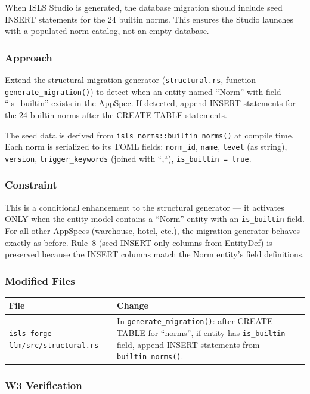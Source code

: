\documentclass[11pt,a4paper]{article}
\begin{document}
When ISLS Studio is generated, the database migration should include
seed INSERT statements for the 24 builtin norms. This ensures the
Studio launches with a populated norm catalog, not an empty database.

\subsubsection{Approach}

Extend the structural migration generator (\texttt{structural.rs},
function \texttt{generate\_migration()}) to detect when an entity
named ``Norm'' with field ``is\_builtin'' exists in the AppSpec. If
detected, append INSERT statements for the 24 builtin norms after
the CREATE TABLE statements.

The seed data is derived from \texttt{isls\_norms::builtin\_norms()}
at compile time. Each norm is serialized to its TOML fields:
\texttt{norm\_id}, \texttt{name}, \texttt{level} (as string),
\texttt{version}, \texttt{trigger\_keywords} (joined with ``,``),
\texttt{is\_builtin = true}.

\subsubsection{Constraint}

This is a conditional enhancement to the structural generator --- it
activates ONLY when the entity model contains a ``Norm'' entity with
an \texttt{is\_builtin} field. For all other AppSpecs (warehouse,
hotel, etc.), the migration generator behaves exactly as before.
Rule~8 (seed INSERT only columns from EntityDef) is preserved because
the INSERT columns match the Norm entity's field definitions.

\subsubsection{Modified Files}

\begin{longtable}{lp{10cm}}
\toprule
\textbf{File} & \textbf{Change} \\
\midrule
\texttt{isls-forge-llm/src/structural.rs}
  & In \texttt{generate\_migration()}: after CREATE TABLE for
    ``norms'', if entity has \texttt{is\_builtin} field, append
    INSERT statements from \texttt{builtin\_norms()}. \\
\bottomrule
\end{longtable}

\subsubsection{W3 Verification}
\end{document}
